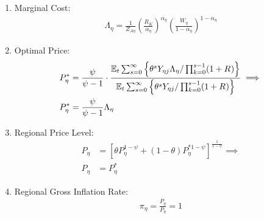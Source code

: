 \documentclass[../thesis.tex]{subfiles}
\begin{document}
\begin{enumerate}
\begin{comment}
			\item Production Function:
		\begin{align}
			Y_{\eta j} = Z_{A\eta} L_{\eta j} \label{ext-mod:reg-ss-int-good-firm-production-function}
		\end{align}
		
		\item Marginal Cost:
		\begin{align}
			\Lambda_{\eta} = \frac{W_{\eta}}{Z_{A\eta}} \label{ext-mod:reg-ss-int-good-firm-FOC-Lt}
		\end{align}		
		
	\end{comment}
	
	\item Marginal Cost:
	\begin{align}
		\Lambda_{\eta} = \frac{1}{Z_{A\eta}} \left( \frac{R_{K}}{{\alpha_{\eta}}} \right)^{{\alpha_{\eta}}} \left( \frac{W_{\eta}}{1-\alpha_{\eta}} \right)^{1-\alpha_{\eta}} \label{ext-mod:reg-ss-int-good-firm-MC-2}
	\end{align}
	
	\item Optimal Price:
	\begin{align}
		P_{\eta}^{\ast} &= \frac{\psi}{\psi-1} \cdot \frac{ {\mathbb{E}_{t}} \sum_{s=0}^{\infty} \left\{ \theta^s Y_{\eta j} \Lambda_{\eta} / \prod_{k=0}^{s-1}(1+R_{}) \right\}} {{\mathbb{E}_{t}} \sum_{s=0}^{\infty} \left\{ \theta^s Y_{\eta j} / \prod_{k=0}^{s-1}(1 + R_{}) \right\}} \implies \nonumber \\
		P_{\eta}^{\ast} &= \frac{\psi}{\psi-1} \Lambda_{\eta} \label{ext-mod:reg-ss-int-good-firm-optimal-price-FOC-3}
	\end{align}
	
	\item Regional Price Level:
	\begin{align}
		P_{\eta} &= \left[ \theta P_{\eta}^{1-\psi} + (1-\theta) P_{\eta}^{\ast 1-\psi} \right]^\frac{1}{1-\psi} \implies \nonumber \\
		P_{\eta} &= P_{\eta}^{\ast} \label{ext-mod:reg-ss-general-price-level}
	\end{align}
	
	\item Regional Gross Inflation Rate:
	\begin{align}
		\pi_{\eta} = \frac{P_{\eta}}{P_{\eta}} = 1 \label{ext-mod:reg-ss-regional-inflation}
	\end{align}
	
	\begin{comment}
			\item Intermediate-goods Firms Profit:
		\begin{align}
			\Pi_{\eta} &= \int_{0}^{1} P_{\eta} Y_{\eta j} - W_{\eta} L_{\eta j} \dif j \label{ext-mod:reg-ss-int-good-firm-profit-total-2}
		\end{align}
		

\end{comment}
\end{enumerate}
\end{document}
